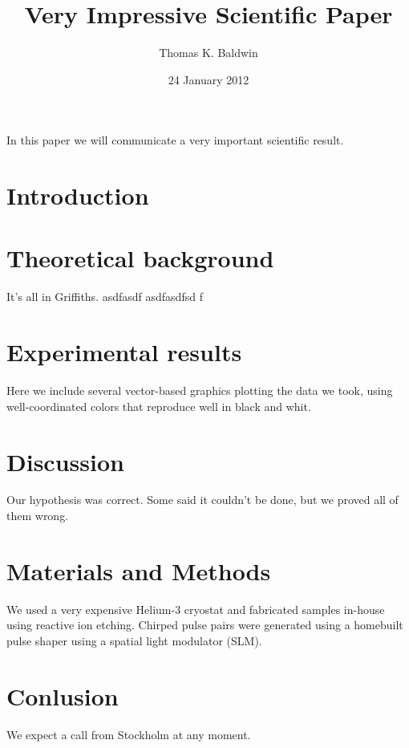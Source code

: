 \documentclass[11pt]{amsart}
\title{Very Impressive Scientific Paper}
\author{Thomas K. Baldwin}
\date{24 January 2012}
\begin{document}
\maketitle

In this paper we will communicate a very important scientific result.

\section{Introduction}

\section{Theoretical background}

It's all in Griffiths.
asdfasdf asdfasdfsd f
\section{Experimental results}

Here we include several vector-based graphics plotting the data we
took, using well-coordinated colors that reproduce well in black and
whit.

\section{Discussion}

Our hypothesis was correct. Some said it couldn't be done, but we
proved all of them wrong.

\section{Materials and Methods}

We used a very expensive Helium-3 cryostat and fabricated samples
in-house using reactive ion etching. Chirped pulse pairs were
generated using a homebuilt pulse shaper using a spatial light
modulator (SLM).

\section{Conlusion}

We expect a call from Stockholm at any moment.
\end{document}
